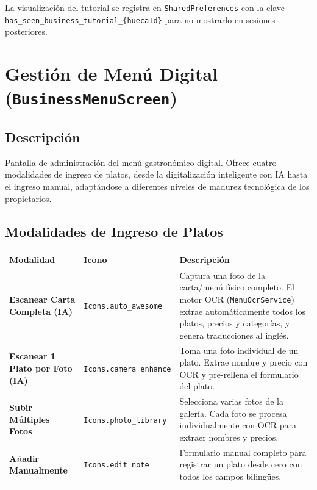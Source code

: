\documentclass[11pt, a4paper, oneside]{report}
\begin{document}
La visualización del tutorial se registra en \texttt{SharedPreferences} con la clave \texttt{has\_seen\_business\_tutorial\_\{huecaId\}} para no mostrarlo en sesiones posteriores.

\section{Gestión de Menú Digital (\texttt{BusinessMenuScreen})}

\subsection{Descripción}
Pantalla de administración del menú gastronómico digital. Ofrece cuatro modalidades de ingreso de platos, desde la digitalización inteligente con IA hasta el ingreso manual, adaptándose a diferentes niveles de madurez tecnológica de los propietarios.

\subsection{Modalidades de Ingreso de Platos}

\begin{longtable}{>{\bfseries}p{4cm} p{2cm} p{7cm}}
\toprule
\textbf{Modalidad} & \textbf{Icono} & \textbf{Descripción} \\
\midrule
Escanear Carta Completa (IA) & \texttt{Icons.auto\_awesome} & Captura una foto de la carta/menú físico completo. El motor OCR (\texttt{MenuOcrService}) extrae automáticamente todos los platos, precios y categorías, y genera traducciones al inglés. \\
\addlinespace
Escanear 1 Plato por Foto (IA) & \texttt{Icons.camera\_enhance} & Toma una foto individual de un plato. Extrae nombre y precio con OCR y pre-rellena el formulario del plato. \\
\addlinespace
Subir Múltiples Fotos & \texttt{Icons.photo\_library} & Selecciona varias fotos de la galería. Cada foto se procesa individualmente con OCR para extraer nombres y precios. \\
\addlinespace
Añadir Manualmente & \texttt{Icons.edit\_note} & Formulario manual completo para registrar un plato desde cero con todos los campos bilingües. \\
\bottomrule
\end{longtable}
\end{document}
